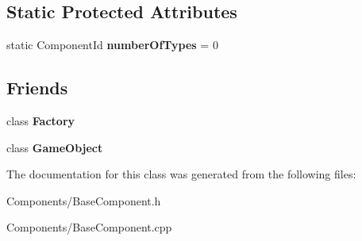\subsection*{Static Protected Attributes}
\begin{DoxyCompactItemize}
\item 
\mbox{\label{classBaseComponent_a084ade347bc71a7f0d3b17ecdc2225a4}} 
static Component\+Id {\bfseries number\+Of\+Types} = 0
\end{DoxyCompactItemize}
\subsection*{Friends}
\begin{DoxyCompactItemize}
\item 
\mbox{\label{classBaseComponent_a328c093d609680cca505905c6d49901a}} 
class {\bfseries Factory}
\item 
\mbox{\label{classBaseComponent_a00df87c957d8f7ee0fc51f07a0542f4a}} 
class {\bfseries Game\+Object}
\end{DoxyCompactItemize}


The documentation for this class was generated from the following files\+:\begin{DoxyCompactItemize}
\item 
Components/Base\+Component.\+h\item 
Components/Base\+Component.\+cpp\end{DoxyCompactItemize}
